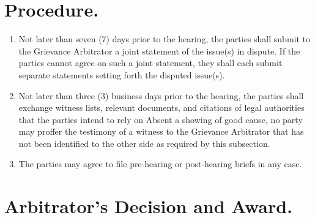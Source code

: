 \documentclass[
]{book}
\providecommand{\tightlist}{%
  \setlength{\itemsep}{0pt}\setlength{\parskip}{0pt}}
\begin{document}
\hypertarget{procedure.}{%
\section{Procedure.}\label{procedure.}}

\begin{enumerate}
\def\labelenumi{(\alph{enumi})}
\tightlist
\item
  Not later than seven (7) days prior to the hearing, the parties shall submit to the Grievance Arbitrator a joint statement of the issue(s) in dispute. If the parties cannot agree on such a joint statement, they shall each submit separate statements setting forth the disputed issue(s).
\item
  Not later than three (3) business days prior to the hearing, the parties shall exchange witness lists, relevant documents, and citations of legal authorities that the parties intend to rely on Absent a showing of good cause, no party may proffer the testimony of a witness to the Grievance Arbitrator that has not been identified to the other side as required by this subsection.
\item
  The parties may agree to file pre-hearing or post-hearing briefs in any case.
\end{enumerate}

\hypertarget{arbitrators-decision-and-award.}{%
\section{Arbitrator's Decision and Award.}\label{arbitrators-decision-and-award.}}
\end{document}

